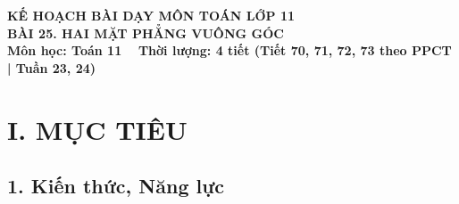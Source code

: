 \documentclass[12pt, a4paper]{article}
\begin{document}
\begin{center}
    {\fontsize{14pt}{17pt}\selectfont \textbf{KẾ HOẠCH BÀI DẠY MÔN TOÁN LỚP 11}}\\[6pt]
    {\fontsize{16pt}{19pt}\selectfont \textbf{BÀI 25. HAI MẶT PHẲNG VUÔNG GÓC}}\\[4pt]
    {\fontsize{12pt}{15pt}\selectfont \textbf{Môn học: Toán 11} \ \textbar \ \textbf{Thời lượng: 4 tiết (Tiết 70, 71, 72, 73 theo PPCT | Tuần 23, 24)}}
\end{center}

\vspace{5pt}

\section*{I. MỤC TIÊU}

\subsection*{1. Kiến thức, Năng lực}
\end{document}
